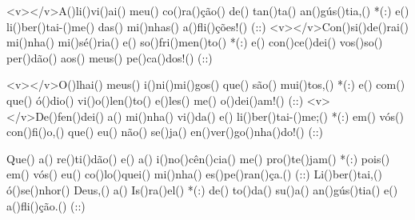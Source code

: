 <v></v>A()li()vi()ai() meu() co()ra()ção() de() tan()ta() an()gús()tia,() *(:)
e() li()ber()tai-()me() das() mi()nhas() a()fli()ções!() (::)
<v></v>Con()si()de()rai() mi()nha() mi()sé()ria() e() so()fri()men()to() *(:)
e() con()ce()dei() vos()so() per()dão() aos() meus() pe()ca()dos!() (::)

<v></v>O()lhai() meus() i()ni()mi()gos() que() são() mui()tos,() *(:)
e() com() que() ó()dio() vi()o()len()to() e()les() me() o()dei()am!() (::)
<v></v>De()fen()dei() a() mi()nha() vi()da() e() li()ber()tai-()me;() *(:)
em() vós() con()fi()o,() que() eu() não() se()ja() en()ver()go()nha()do!() (::)

Que() a() re()ti()dão() e() a() i()no()cên()cia() me() pro()te()jam() *(:)
pois() em() vós() eu() co()lo()quei() mi()nha() es()pe()ran()ça.() (::)
Li()ber()tai,() ó()se()nhor() Deus,() a() Is()ra()el() *(:)
de() to()da() su()a() an()gús()tia() e() a()fli()ção.() (::)